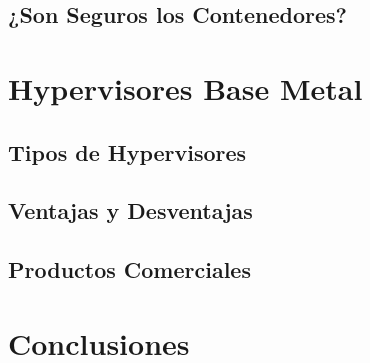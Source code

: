 \documentclass[%
 reprint,
 amsmath,amssymb,
 aps,
]{revtex4-1}
\begin{document}
\subsection{¿Son Seguros los Contenedores?}

\section {Hypervisores Base Metal}\label{sec:7}


\subsection{Tipos de Hypervisores}
\subsection{Ventajas y Desventajas}
\subsection{Productos Comerciales}

\section{Conclusiones}\label{sec:8}
\end{document}

